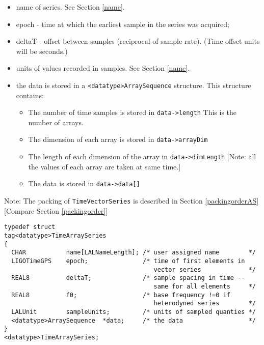 \documentclass[]{ligodcc}
\begin{document}
\begin{itemize}
\vspace{-0.15in}
\item
name of series. See Section \ref{name}.
\vspace{-0.15in}
\item
epoch  -  time at which the earliest sample in the series was acquired;
\vspace{-0.15in}
\item
deltaT  - offset between samples (reciprocal of sample rate).  (Time
offset units will be seconds.)
\vspace{-0.15in}
\item
units of values recorded in samples. See Section \ref{name}.
\vspace{-0.15in}
\item
the data is stored in a {\tt <datatype>ArraySequence}  structure. This
structure contains:
\begin{itemize}
\vspace{-0.10in}
\item
The number of time samples is stored in {\tt data->length} This is the
number of arrays.
\vspace{-0.10in}
\item
The dimension of each array is stored in {\tt data->arrayDim}
\vspace{-0.10in}
\item
The length of each dimension of the array in {\tt data->dimLength}
[Note:  all the values of each array are taken at same time.]
\vspace{-0.10in}
\item
The data is stored in {\tt data->data[]}
\end{itemize}
\end{itemize}

Note: The packing of {\tt TimeVectorSeries} is described in Section
\ref{packingorderAS} [Compare Section \ref{packingorder}] 

{\footnotesize
\begin{verbatim}
typedef struct
tag<datatype>TimeArraySeries
{
  CHAR           name[LALNameLength]; /* user assigned name        */
  LIGOTimeGPS    epoch;               /* time of first elements in
                                         vector series             */
  REAL8          deltaT;              /* sample spacing in time -- 
                                         same for all elements     */
  REAL8          f0;                  /* base frequency !=0 if 
                                         heterodyned series        */
  LALUnit        sampleUnits;         /* units of sampled quanties */
  <datatype>ArraySequence  *data;     /* the data                  */
}
<datatype>TimeArraySeries;
\end{verbatim}}
\end{document}
